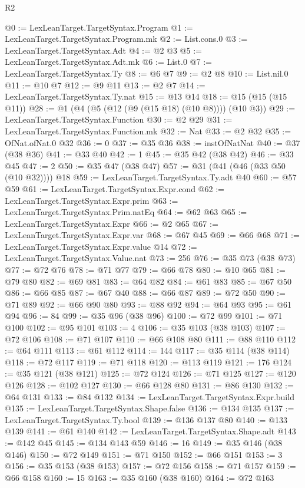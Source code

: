 \begin{lexlean}{R2}
\begin{coremodule}
@0 := LexLeanTarget.TargetSyntax.Program
@1 := LexLeanTarget.TargetSyntax.Program.mk
@2 := List.cons.{0}
@3 := LexLeanTarget.TargetSyntax.Adt
@4 := @2 @3
@5 := LexLeanTarget.TargetSyntax.Adt.mk
@6 := List.{0}
@7 := LexLeanTarget.TargetSyntax.Ty
@8 := @6 @7
@9 := @2 @8
@10 := List.nil.{0}
@11 := @10 @7
@12 := @9 @11
@13 := @2 @7
@14 := LexLeanTarget.TargetSyntax.Ty.nat
@15 := @13 @14
@18 := @15 (@15 (@15 @11))
@28 := @1 (@4 (@5 (@12 (@9 (@15 @18) (@10 @8)))) (@10 @3))
@29 := LexLeanTarget.TargetSyntax.Function
@30 := @2 @29
@31 := LexLeanTarget.TargetSyntax.Function.mk
@32 := Nat
@33 := @2 @32
@35 := OfNat.ofNat.{0} @32
@36 := 0
@37 := @35 @36
@38 := instOfNatNat
@40 := @37 (@38 @36)
@41 := @33 @40
@42 := 1
@45 := @35 @42 (@38 @42)
@46 := @33 @45
@47 := 2
@50 := @35 @47 (@38 @47)
@57 := @31 (@41 (@46 (@33 @50 (@10 @32)))) @18
@59 := LexLeanTarget.TargetSyntax.Ty.adt @40
@60 := @57 @59
@61 := LexLeanTarget.TargetSyntax.Expr.cond
@62 := LexLeanTarget.TargetSyntax.Expr.prim
@63 := LexLeanTarget.TargetSyntax.Prim.natEq
@64 := @62 @63
@65 := LexLeanTarget.TargetSyntax.Expr
@66 := @2 @65
@67 := LexLeanTarget.TargetSyntax.Expr.var
@68 := @67 @45
@69 := @66 @68
@71 := LexLeanTarget.TargetSyntax.Expr.value @14
@72 := LexLeanTarget.TargetSyntax.Value.nat
@73 := 256
@76 := @35 @73 (@38 @73)
@77 := @72 @76
@78 := @71 @77
@79 := @66 @78
@80 := @10 @65
@81 := @79 @80
@82 := @69 @81
@83 := @64 @82
@84 := @61 @83
@85 := @67 @50
@86 := @66 @85
@87 := @67 @40
@88 := @66 @87
@89 := @72 @50
@90 := @71 @89
@92 := @66 @90 @80
@93 := @88 @92
@94 := @64 @93
@95 := @61 @94
@96 := 84
@99 := @35 @96 (@38 @96)
@100 := @72 @99
@101 := @71 @100
@102 := @95 @101
@103 := 4
@106 := @35 @103 (@38 @103)
@107 := @72 @106
@108 := @71 @107
@110 := @66 @108 @80
@111 := @88 @110
@112 := @64 @111
@113 := @61 @112
@114 := 144
@117 := @35 @114 (@38 @114)
@118 := @72 @117
@119 := @71 @118
@120 := @113 @119
@121 := 176
@124 := @35 @121 (@38 @121)
@125 := @72 @124
@126 := @71 @125
@127 := @120 @126
@128 := @102 @127
@130 := @66 @128 @80
@131 := @86 @130
@132 := @64 @131
@133 := @84 @132
@134 := LexLeanTarget.TargetSyntax.Expr.build
@135 := LexLeanTarget.TargetSyntax.Shape.false
@136 := @134 @135
@137 := LexLeanTarget.TargetSyntax.Ty.bool
@139 := @136 @137 @80
@140 := @133 @139
@141 := @61 @140
@142 := LexLeanTarget.TargetSyntax.Shape.adt
@143 := @142 @45
@145 := @134 @143 @59
@146 := 16
@149 := @35 @146 (@38 @146)
@150 := @72 @149
@151 := @71 @150
@152 := @66 @151
@153 := 3
@156 := @35 @153 (@38 @153)
@157 := @72 @156
@158 := @71 @157
@159 := @66 @158
@160 := 15
@163 := @35 @160 (@38 @160)
@164 := @72 @163

\end{coremodule}
\end{lexlean}
